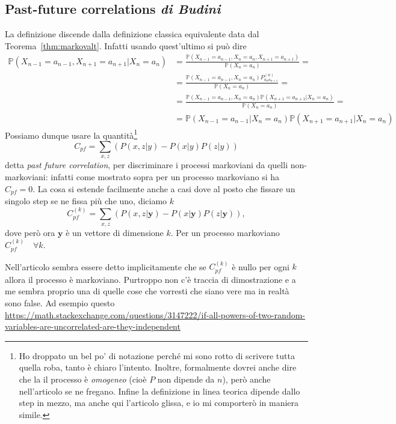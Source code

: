 \documentclass[a4]{article}
\begin{document}
\subsection{Past-future correlations \textit{di Budini} \cite{budini2018quantum}}
La definizione discende dalla definizione classica equivalente data dal
Teorema~\ref{thm:markovalt}. Infatti usando quest'ultimo si può dire
\begin{align*}
	\mathbb{P}(X_{n-1}=a_{n-1}, X_{n+1}=a_{n+1}|X_{n}=a_{n})&=
    \frac{\mathbb{P}(X_{n-1}=a_{n-1}, X_{n}=a_{n}, X_{n+1}=a_{n+1})}{\mathbb{P}(X_{n}=a_{n})}=\\
  &=\frac{\mathbb{P}(X_{n-1}=a_{n-1}, X_{n}=a_{n}) P^{(n)}_{a_n a_{n+1}}}
  {\mathbb{P}(X_{n}=a_{n})}=\\
  &=\frac{\mathbb{P}(X_{n-1}=a_{n-1}, X_{n}=a_{n}) \mathbb{P}(X_{n+1}=a_{n+1}|X_{n}=a_{n})}
  {\mathbb{P}(X_{n}=a_{n})}=\\
  &=\mathbb{P}(X_{n-1}=a_{n-1}|X_{n}=a_{n}) \mathbb{P}(X_{n+1}=a_{n+1}|X_{n}=a_{n})
\end{align*}
Possiamo dunque usare  la quantità\footnote{Ho droppato un bel po' di notazione perché
mi sono rotto di scrivere tutta quella roba, tanto è chiaro l'intento. Inoltre, formalmente
dovrei anche dire che la il processo è \emph{omogeneo} (cioè \(P\) non dipende da
\(n\)), però anche nell'articolo  se ne fregano. Infine la definizione in linea teorica
dipende dallo step in mezzo, ma anche qui l'articolo glissa, e io mi comporterò in maniera
simile.} 
\[C_{pf} = \sum_{x,z}\left(P(x,z|y)-P(x|y)P(z|y)\right)\]
detta \emph{past future correlation}, per discriminare i processi markoviani da
quelli non-markoviani: infatti come mostrato sopra per un processo markoviano si ha
\(C_{pf} = 0\). La cosa si estende facilmente anche a casi dove al
posto che fissare un singolo step se ne  fissa più che uno, diciamo \(k\)
\[C^{(k)}_{pf} = \sum_{x,z}\left(P(x,z|\bm{y})-P(x|\bm{y})P(z|\bm{y})\right),\]
dove però ora \(\bm{y}\) è un vettore di dimensione \(k\).
Per un processo markoviano \(C^{(k)}_{pf} \quad \forall k\).
\begin{tcolorbox}[colback=yellow!5!white,colframe=yellow!85!black,title=Nota]
	Nell'articolo sembra essere detto implicitamente che se \(C^{(k)}_{pf}\)
	è nullo per ogni \(k\) allora il  processo è markoviano. Purtroppo non c'è traccia
	di dimostrazione e a me sembra proprio una  di quelle cose che vorresti che siano vere
	ma in realtà sono false. Ad esempio questo \url{https://math.stackexchange.com/questions/3147222/if-all-powers-of-two-random-variables-are-uncorrelated-are-they-independent}
\end{tcolorbox}
\end{document}
